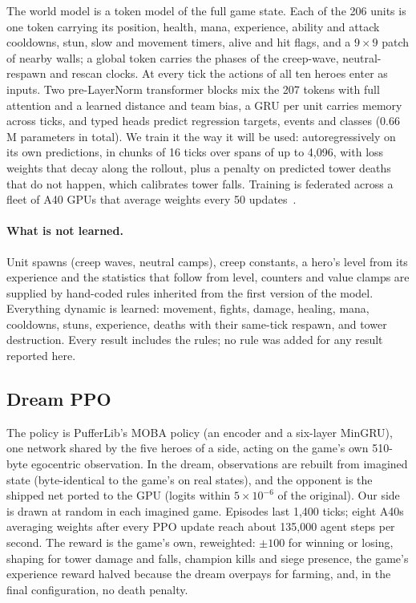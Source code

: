 \documentclass[11pt]{article}
\begin{document}
The world model is a token model of the full game state. Each of the 206 units is one token carrying its position, health, mana, experience, ability and attack cooldowns, stun, slow and movement timers, alive and hit flags, and a $9\times9$ patch of nearby walls; a global token carries the phases of the creep-wave, neutral-respawn and rescan clocks. At every tick the actions of all ten heroes enter as inputs. Two pre-LayerNorm transformer blocks mix the 207 tokens with full attention and a learned distance and team bias, a GRU per unit carries memory across ticks, and typed heads predict regression targets, events and classes (0.66\,M parameters in total). We train it the way it will be used: autoregressively on its own predictions, in chunks of 16 ticks over spans of up to 4,096, with loss weights that decay along the rollout, plus a penalty on predicted tower deaths that do not happen, which calibrates tower falls. Training is federated across a fleet of A40 GPUs that average weights every 50 updates~\cite{mcmahan2017fedavg}.

\paragraph{What is not learned.} Unit spawns (creep waves, neutral camps), creep constants, a hero's level from its experience and the statistics that follow from level, counters and value clamps are supplied by hand-coded rules inherited from the first version of the model. Everything dynamic is learned: movement, fights, damage, healing, mana, cooldowns, stuns, experience, deaths with their same-tick respawn, and tower destruction. Every result includes the rules; no rule was added for any result reported here.

\subsection{Dream PPO}

The policy is PufferLib's MOBA policy (an encoder and a six-layer MinGRU), one network shared by the five heroes of a side, acting on the game's own 510-byte egocentric observation. In the dream, observations are rebuilt from imagined state (byte-identical to the game's on real states), and the opponent is the shipped net ported to the GPU (logits within $5\times10^{-6}$ of the original). Our side is drawn at random in each imagined game. Episodes last 1,400 ticks; eight A40s averaging weights after every PPO update reach about 135,000 agent steps per second. The reward is the game's own, reweighted: $\pm100$ for winning or losing, shaping for tower damage and falls, champion kills and siege presence, the game's experience reward halved because the dream overpays for farming, and, in the final configuration, no death penalty.
\end{document}
